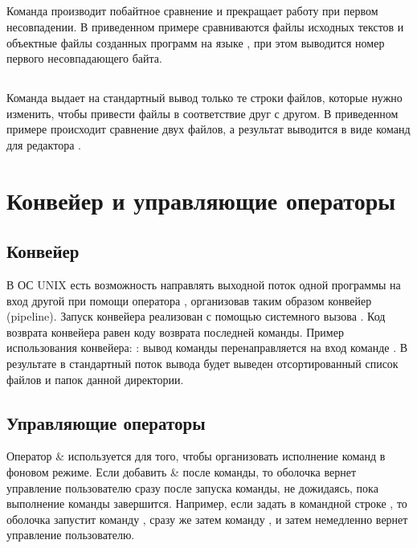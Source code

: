 \newpage

\subsection{}

Команда  производит побайтное сравнение и прекращает работу при первом несовпадении. В приведенном примере сравниваются файлы исходных текстов и объектные файлы созданных программ на языке , при этом выводится номер первого несовпадающего байта.


\subsection{}

Команда  выдает на стандартный вывод только те строки файлов, которые нужно изменить, чтобы привести файлы в соответствие друг с другом. В приведенном примере происходит сравнение двух файлов, а результат выводится в виде команд для редактора .


\newpage

\section{Конвейер и управляющие операторы}

\subsection{Конвейер}

В ОС UNIX есть возможность направлять выходной поток одной программы на вход другой при помощи оператора \code{|}, организовав таким образом конвейер (pipeline). Запуск конвейера реализован с помощью системного вызова . Код возврата конвейера равен коду возврата последней команды. Пример использования конвейера: : вывод команды  перенаправляется на вход команде . В результате в стандартный поток вывода будет выведен отсортированный список файлов и папок данной директории.

\subsection{Управляющие операторы}

Оператор \& используется для того, чтобы организовать исполнение команд в фоновом режиме. Если добавить \& после команды, то оболочка вернет управление пользователю сразу после запуска команды, не дожидаясь, пока выполнение команды завершится. Например, если задать в командной строке , то оболочка запустит команду , сразу же затем команду , и затем немедленно вернет управление пользователю.

